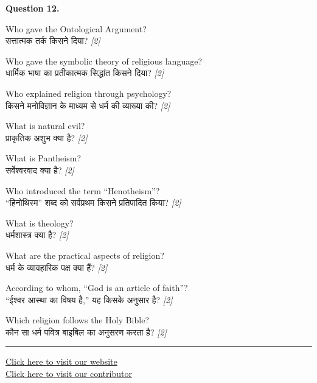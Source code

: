 \documentclass[11pt,a4paper]{article}
\newcommand{\pts}[1]{\hfill \textit{[#1]}}
\begin{document}
\noindent \textbf{Question 12.}
\begin{parts}
  \item Who gave the Ontological Argument?\\[1pt]
        सत्तात्मक तर्क किसने दिया? \pts{2}

  \item Who gave the symbolic theory of religious language?\\[1pt]
        धार्मिक भाषा का प्रतीकात्मक सिद्धांत किसने दिया? \pts{2}

  \item Who explained religion through psychology?\\[1pt]
        किसने मनोविज्ञान के माध्यम से धर्म की व्याख्या की? \pts{2}

  \item What is natural evil?\\[1pt]
        प्राकृतिक अशुभ क्या है? \pts{2}

  \item What is Pantheism?\\[1pt]
        सर्वेश्वरवाद क्या है? \pts{2}

  \item Who introduced the term ``Henotheism''?\\[1pt]
        ``हिनोथिस्म'' शब्द को सर्वप्रथम किसने प्रतिपादित किया? \pts{2}

  \item What is theology?\\[1pt]
        धर्मशास्त्र क्या है? \pts{2}

  \item What are the practical aspects of religion?\\[1pt]
        धर्म के व्यावहारिक पक्ष क्या हैं? \pts{2}

  \item According to whom, ``God is an article of faith''?\\[1pt]
        ``ईश्वर आस्था का विषय है,'' यह किसके अनुसार है? \pts{2}

  \item Which religion follows the Holy Bible?\\[1pt]
        कौन सा धर्म पवित्र बाइबिल का अनुसरण करता है? \pts{2}
\end{parts}

\vfill
\rule{\linewidth}{0.4pt}

\begin{center}\small
\href{https://bhu-exam.vercel.app/}{Click here to visit our website}\\[4pt]
\href{https://me-aryan.vercel.app/}{Click here to visit our contributor}
\end{center}
\end{document}
